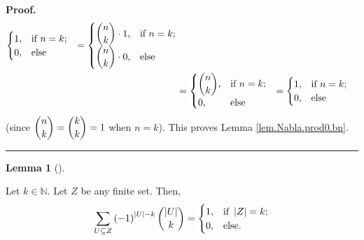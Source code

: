 \documentclass[numbers=enddot,12pt,final,onecolumn,notitlepage]{scrartcl}%
\numberwithin{exer}{subsection}
\theoremstyle{definition}
\newtheorem{lem}[theo]{Lemma}
\newenvironment{lemma}[1][]
{\begin{lem}[#1]\begin{leftbar}}
{\end{leftbar}\end{lem}}
\newenvironment{proof}[1][Proof]{\noindent\textbf{#1.} }{\ \rule{0.5em}{0.5em}}
\let\sumnonlimits\sum
\renewcommand{\sum}{\sumnonlimits\limits}
\begin{document}
\begin{proof}
\begin{align*}
\begin{cases}
1, & \text{if }n=k;\\
0, & \text{else}%
\end{cases}
\ \ =%
\begin{cases}
\dbinom{n}{k}\cdot1, & \text{if }n=k;\\
\dbinom{n}{k}\cdot0, & \text{else}%
\end{cases}
\\
&  =%
\begin{cases}
\dbinom{n}{k}, & \text{if }n=k;\\
0, & \text{else}%
\end{cases}
\ \ =%
\begin{cases}
1, & \text{if }n=k;\\
0, & \text{else}%
\end{cases}
\end{align*}
(since $\dbinom{n}{k}=\dbinom{k}{k}=1$ when $n=k$). This proves Lemma
\ref{lem.Nabla.prod0.bn}.
\end{proof}

\begin{lemma}
\label{lem.Nabla.prod0.b}Let $k\in\mathbb{N}$. Let $Z$ be any finite set.
Then,%
\[
\sum_{U\subseteq Z}\left(  -1\right)  ^{\left\vert U\right\vert -k}%
\dbinom{\left\vert U\right\vert }{k}=%
\begin{cases}
1, & \text{if }\left\vert Z\right\vert =k;\\
0, & \text{else.}%
\end{cases}
\]

\end{lemma}
\end{document}
